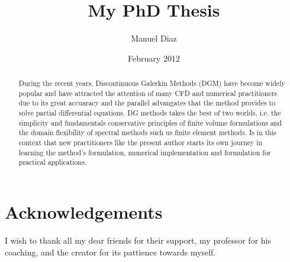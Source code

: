 \documentclass[a4paper]{report}
\begin{document}
\author{Manuel Diaz}
\title{My PhD Thesis}
\date{February 2012}
\maketitle

\tableofcontents

\chapter*{Acknowledgements}
I wish to thank all my dear friends for their support, my professor for his coaching, and the creator for its pattience towards myself.

\begin{abstract}
During the recent years, Discontinuous Galerkin Methods (DGM) have become widely popular and have attracted the attention of many CFD and numerical practitioners due to its great accuaracy and the parallel advangates that the method provides to solve partial differential equations. DG methods takes the best of two worlds, i.e. the simplicity and fundamentals conservative principles of finite volume formulations and the domain flexibility of spectral methods such us finite element methods. Is in this context that new practitioners like the present author starts its own journey in learning the method's formulation, numerical implementation and formulation for practical applications. 
\end{abstract}






	
	
	
	
	



\end{document}

